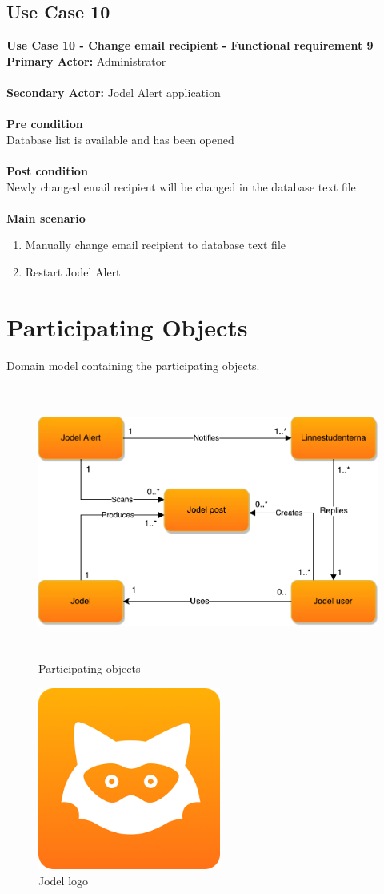 \documentclass[a4paper,12pt]{article}
\begin{document}
\subsection{Use Case 10}
\textbf{Use Case 10 - Change email recipient - Functional requirement 9}\\
\textbf{Primary Actor:}
Administrator\\\\
\textbf{Secondary Actor:}
Jodel Alert application\\\\
\textbf{Pre condition}\\
Database list is available and has been opened\\\\
\textbf{Post condition}\\
Newly changed email recipient will be changed in the database text file\\\\
\textbf{Main scenario}
\begin{enumerate}
	\item Manually change email recipient to database text file
	\item Restart Jodel Alert
\end{enumerate}
\clearpage
\section{Participating Objects}
Domain model containing the participating objects.\\

\begin{figure}[!h]
	\centering
	\includegraphics[height=9cm]{img/ParticipatingObjects.pdf}
	\caption{Participating objects}
	\label{Participating objects}
\end{figure}
\begin{figure}[!h]
	\centering
	\includegraphics[height=6cm]{img/jodel.png}
	\caption{Jodel logo}
	\label{Jodel}
\end{figure}
\end{document}
